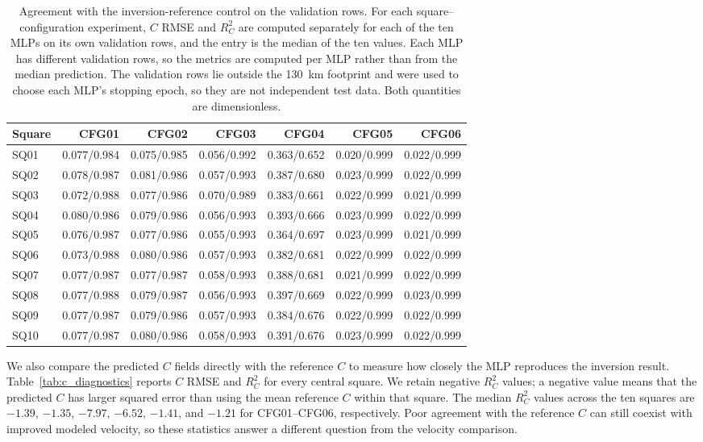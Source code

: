 \documentclass[review,jog]{igs}
\providecommand{\toprule}{\hline}
\providecommand{\midrule}{\hline}
\providecommand{\bottomrule}{\hline}
\begin{document}
\begin{table}
\caption{Agreement with the inversion-reference control on the validation rows. For each square--configuration experiment, $C$ RMSE and $R_C^2$ are computed separately for each of the ten MLPs on its own validation rows, and the entry is the median of the ten values. Each MLP has different validation rows, so the metrics are computed per MLP rather than from the median prediction. The validation rows lie outside the 130~km footprint and were used to choose each MLP's stopping epoch, so they are not independent test data. Both quantities are dimensionless.}
\label{tab:validation_c_diagnostics}
\centering
\scriptsize
\setlength{\tabcolsep}{4pt}
\begin{tabular}{lrrrrrr}
\toprule
Square & CFG01 & CFG02 & CFG03 & CFG04 & CFG05 & CFG06\\
\midrule
SQ01 & 0.077/0.984 & 0.075/0.985 & 0.056/0.992 & 0.363/0.652 & 0.020/0.999 & 0.022/0.999 \\
SQ02 & 0.078/0.987 & 0.081/0.986 & 0.057/0.993 & 0.387/0.680 & 0.023/0.999 & 0.022/0.999 \\
SQ03 & 0.072/0.988 & 0.077/0.986 & 0.070/0.989 & 0.383/0.661 & 0.022/0.999 & 0.021/0.999 \\
SQ04 & 0.080/0.986 & 0.079/0.986 & 0.056/0.993 & 0.393/0.666 & 0.023/0.999 & 0.022/0.999 \\
SQ05 & 0.076/0.987 & 0.077/0.986 & 0.055/0.993 & 0.364/0.697 & 0.023/0.999 & 0.021/0.999 \\
SQ06 & 0.073/0.988 & 0.080/0.986 & 0.057/0.993 & 0.382/0.681 & 0.022/0.999 & 0.022/0.999 \\
SQ07 & 0.077/0.987 & 0.077/0.987 & 0.058/0.993 & 0.388/0.681 & 0.021/0.999 & 0.022/0.999 \\
SQ08 & 0.077/0.988 & 0.079/0.987 & 0.056/0.993 & 0.397/0.669 & 0.022/0.999 & 0.023/0.999 \\
SQ09 & 0.077/0.987 & 0.079/0.986 & 0.057/0.993 & 0.384/0.676 & 0.022/0.999 & 0.022/0.999 \\
SQ10 & 0.077/0.987 & 0.080/0.986 & 0.058/0.993 & 0.391/0.676 & 0.023/0.999 & 0.022/0.999 \\
\bottomrule
\end{tabular}
\end{table}

We also compare the predicted $C$ fields directly with the reference $C$ to
measure how closely the MLP reproduces the inversion result.
Table~\ref{tab:c_diagnostics} reports $C$ RMSE and $R_C^2$ for every central
square. We retain negative $R_C^2$ values; a negative value means that the
predicted $C$ has larger squared error than using the mean reference $C$ within
that square. The median $R_C^2$ values across the ten squares are $-1.39$,
$-1.35$, $-7.97$, $-6.52$, $-1.41$, and $-1.21$ for CFG01--CFG06,
respectively. Poor agreement with the reference $C$ can still coexist with improved modeled velocity, so these statistics answer a different question from the velocity comparison.
\end{document}
